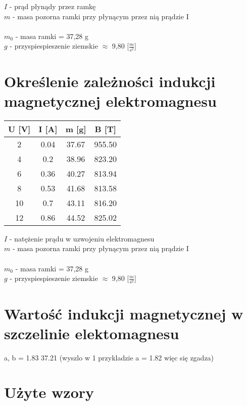\documentclass{article}
\begin{document}
$I$ - prąd płynądy przez ramkę \\
$m$ - masa pozorna ramki przy płynącym przez nią prądzie I \\\\
$m_0$ - masa ramki = 37,28 g\\
$g$ - przyspiespieszenie ziemskie $\approx$ 9,80 [$\frac{m}{s^2}$]

\section{Określenie zależności indukcji magnetycznej elektromagnesu}

\begin{center}
  \begin{tabular}{ c | c | c | c}
  U [V] & I [A] & m [g] & B [T]\\
  \hline
  2 & 0.04 & 37.67 & 955.50\\
  4 & 0.2 & 38.96 & 823.20\\
  6 & 0.36 & 40.27 & 813.94\\
  8 & 0.53 & 41.68 & 813.58\\
  10 & 0.7 & 43.11 & 816.20\\
  12 & 0.86 & 44.52 & 825.02\\
  \end{tabular}
\end{center}

$I$ - natężenie prądu w uzwojeniu elektromagnesu \\
$m$ - masa pozorna ramki przy płynącym przez nią prądzie I \\\\
$m_0$ - masa ramki = 37,28 g\\
$g$ - przyspiespieszenie ziemskie $\approx$ 9,80 [$\frac{m}{s^2}$]

\section{Wartość indukcji magnetycznej w szczelinie elektomagnesu}

a, b = 1.83 37.21
(wyszlo w 1 przykladzie a = 1.82 więc się zgadza)

\section{Użyte wzory}
\end{document}
